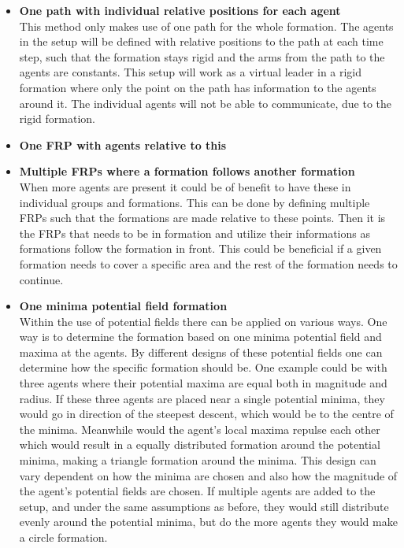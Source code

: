 \begin{itemize}
\begin{itemize}
	\end{itemize}
\item \textbf{One path with individual relative positions for each agent}\\
This method only makes use of one path for the whole formation. The agents in the setup will be defined with relative positions to the path at each time step, such that the formation stays rigid and the arms from the path to the agents are constants. This setup will work as a virtual leader in a rigid formation where only the point on the path has information to the agents around it. The individual agents will not be able to communicate, due to the rigid formation.
\item \textbf{One \ac{FRP} with agents relative to this}\\
\item \textbf{Multiple \ac{FRP}s where a formation follows another formation}\\
When more agents are present it could be of benefit to have these in individual groups and formations. This can be done by defining multiple \ac{FRP}s such that the formations are made relative to these points. Then it is the \ac{FRP}s that needs to be in formation and utilize their informations as formations follow the formation in front. This could be beneficial if a given formation needs to cover a specific area and the rest of the formation needs to continue.
\item \textbf{One minima potential field formation}\\
Within the use of potential fields there can be applied on various ways. One way is to determine the formation based on one minima potential field and maxima at the agents. By different designs of these potential fields one can determine how the specific formation should be. One example could be with three agents where their potential maxima are equal both in magnitude and radius. If these three agents are placed near a single potential minima, they would go in direction of the steepest descent, which would be to the centre of the minima. Meanwhile would the agent's local maxima repulse each other which would result in a equally distributed formation around the potential minima, making a triangle formation around the minima.
This design can vary dependent on how the minima are chosen and also how the magnitude of the agent's potential fields are chosen. If multiple agents are added to the setup, and under the same assumptions as before, they would still distribute evenly around the potential minima, but do the more agents they would make a circle formation.

\end{itemize}
